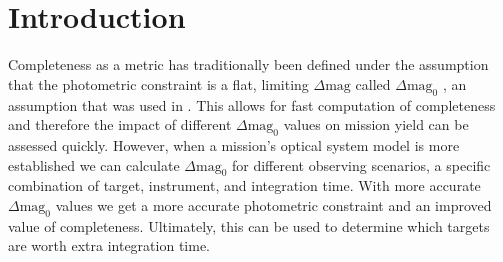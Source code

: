 \section{Introduction}%
\label{sec:ch2_intro}

Completeness as a metric has traditionally been defined under the assumption
that the photometric constraint is a flat, limiting $\Delta\textrm{mag}$ called
$\Delta\textrm{mag}_0$ \citep{brownSingleVisitPhotometric2005}, an assumption
that was used in . This allows for fast computation of
completeness and therefore the impact of different $\Delta\textrm{mag}_0$
values on mission yield can be assessed quickly. However, when a mission's optical
system model is more established we can calculate $\Delta\textrm{mag}_0$ for
different observing scenarios, a specific combination of target, instrument,
and integration time. With more accurate $\Delta\textrm{mag}_0$ values we get a
more accurate photometric constraint and an improved value of completeness.
Ultimately, this can be used to determine which targets are worth extra
integration time.

